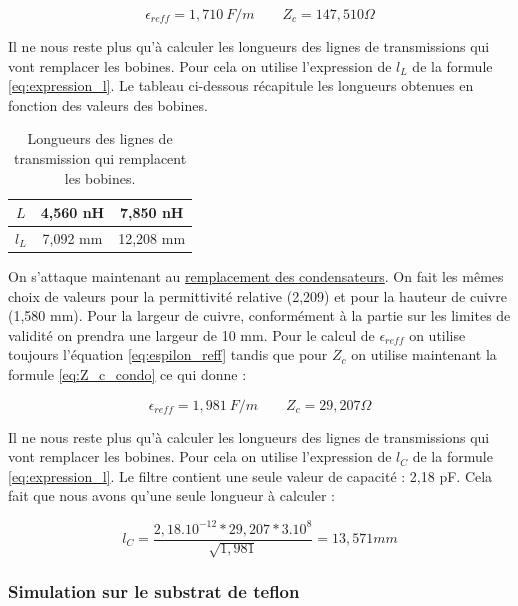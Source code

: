 \documentclass[french]{article}
\begin{document}
\begin{equation}
	\epsilon_{reff} = 1,710\ F/m
	\qquad
	Z_c = 147,510 \Omega
\end{equation}

Il ne nous reste plus qu'à calculer les longueurs des lignes de transmissions qui vont remplacer les bobines. Pour cela on utilise l'expression de $l_L$ de la formule \ref{eq:expression_l}. Le tableau ci-dessous récapitule les longueurs obtenues en fonction des valeurs des bobines.


\begin{table}[H]
	\centering
	\begin{tabular}{|c|c|c|}
		\hline
		$L$ & 4,560 nH & 7,850 nH \\
		\hline
		$l_L$ & 7,092 mm & 12,208 mm\\
		\hline
	\end{tabular}
	\caption{Longueurs des lignes de transmission qui remplacent les bobines.}
	\label{tab:longueur_ligne_bobine_passe_bas}
\end{table}


On s'attaque maintenant au \underline{remplacement des condensateurs}. On fait les mêmes choix de valeurs pour la permittivité relative (2,209) et pour la hauteur de cuivre (1,580 mm). Pour la largeur de cuivre, conformément à la partie sur les limites de validité on prendra une largeur de 10 mm. Pour le calcul de $\epsilon_{reff}$ on utilise toujours l'équation \ref{eq:espilon_reff} tandis que pour $Z_c$ on utilise maintenant la formule \ref{eq:Z_c_condo} ce qui donne :

\begin{equation}
	\epsilon_{reff} = 1,981\ F/m
	\qquad
	Z_c = 29,207 \Omega
\end{equation}

Il ne nous reste plus qu'à calculer les longueurs des lignes de transmissions qui vont remplacer les bobines. Pour cela on utilise l'expression de $l_C$ de la formule \ref{eq:expression_l}. Le filtre contient une seule valeur de capacité : 2,18 pF. Cela fait que nous avons qu'une seule longueur à calculer :

\begin{equation}
	l_C = \frac{2,18.10^{-12} * 29,207 * 3.10^8}{\sqrt{1,981}} = 13,571 mm
\end{equation}



\subsubsection{Simulation sur le substrat de teflon}
\end{document}
